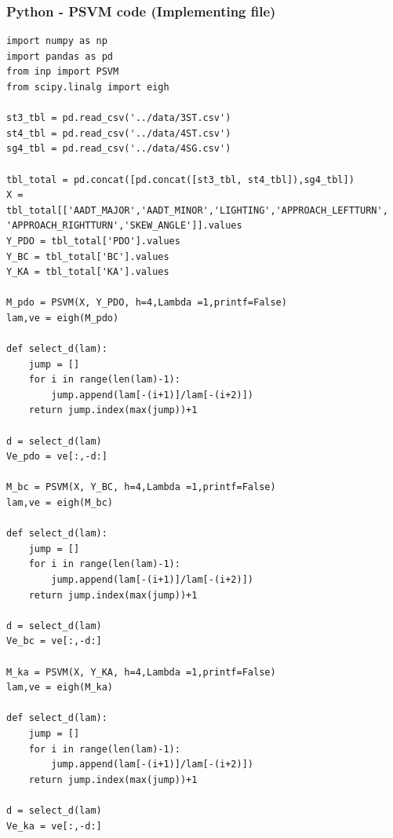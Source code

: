 \documentclass[11pt]{scrartcl} %
\begin{document}
\subsubsection{Python - PSVM code (Implementing file)}
\begin{lstlisting}
import numpy as np
import pandas as pd
from inp import PSVM
from scipy.linalg import eigh

st3_tbl = pd.read_csv('../data/3ST.csv')
st4_tbl = pd.read_csv('../data/4ST.csv')
sg4_tbl = pd.read_csv('../data/4SG.csv')

tbl_total = pd.concat([pd.concat([st3_tbl, st4_tbl]),sg4_tbl])
X = tbl_total[['AADT_MAJOR','AADT_MINOR','LIGHTING','APPROACH_LEFTTURN', 'APPROACH_RIGHTTURN','SKEW_ANGLE']].values
Y_PDO = tbl_total['PDO'].values
Y_BC = tbl_total['BC'].values
Y_KA = tbl_total['KA'].values

M_pdo = PSVM(X, Y_PDO, h=4,Lambda =1,printf=False)
lam,ve = eigh(M_pdo)

def select_d(lam):
    jump = []
    for i in range(len(lam)-1):
        jump.append(lam[-(i+1)]/lam[-(i+2)])
    return jump.index(max(jump))+1

d = select_d(lam)
Ve_pdo = ve[:,-d:]

M_bc = PSVM(X, Y_BC, h=4,Lambda =1,printf=False)
lam,ve = eigh(M_bc)

def select_d(lam):
    jump = []
    for i in range(len(lam)-1):
        jump.append(lam[-(i+1)]/lam[-(i+2)])
    return jump.index(max(jump))+1

d = select_d(lam)
Ve_bc = ve[:,-d:]

M_ka = PSVM(X, Y_KA, h=4,Lambda =1,printf=False)
lam,ve = eigh(M_ka)

def select_d(lam):
    jump = []
    for i in range(len(lam)-1):
        jump.append(lam[-(i+1)]/lam[-(i+2)])
    return jump.index(max(jump))+1

d = select_d(lam)
Ve_ka = ve[:,-d:]
\end{lstlisting}
\end{document}
